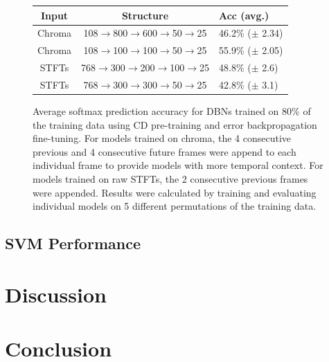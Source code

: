 \documentclass{article}
\begin{document}
\begin{figure}
\begin{tabular}{c|c|l}
Input & Structure & Acc (avg.) \\
\hline
Chroma & 108$\rightarrow$800$\rightarrow$600$\rightarrow$50$\rightarrow$25 & 46.2\% ($\pm$ 2.34) \\
Chroma & 108$\rightarrow$100$\rightarrow$100$\rightarrow$50$\rightarrow$25  & 55.9\% ($\pm$ 2.05) \\
STFTs & 768$\rightarrow$300$\rightarrow$200$\rightarrow$100$\rightarrow$25 & 48.8\% ($\pm$ 2.6) \\
STFTs & 768$\rightarrow$300$\rightarrow$300$\rightarrow$50$\rightarrow$25 & 42.8\% ($\pm$ 3.1) \\
\end{tabular}

\caption{Average softmax prediction accuracy for DBNs trained on 80\% of the
  training data using CD pre-training and error backpropagation fine-tuning.
  For models trained on chroma, the 4 consecutive previous and 4 consecutive
  future frames were append to each individual frame to provide models with
more temporal context.  For models trained on raw STFTs, the 2 consecutive
previous frames were appended. Results were calculated by training and
evaluating individual models on 5 different permutations of the training data.}

\end{figure}

\subsection{SVM Performance}

\section{Discussion}
\label{sec:discussion}

\section{Conclusion}
\label{sec:conclusion}



\end{document}
